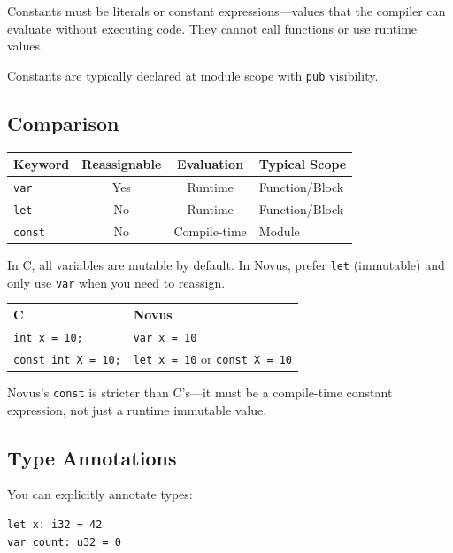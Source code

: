 Constants must be literals or constant expressions---values that the compiler can evaluate without executing code. They cannot call functions or use runtime values.

Constants are typically declared at module scope with \texttt{pub} visibility.

\subsection{Comparison}

\begin{center}
\begin{tabular}{lccl}
\textbf{Keyword} & \textbf{Reassignable} & \textbf{Evaluation} & \textbf{Typical Scope} \\
\hline
\texttt{var} & Yes & Runtime & Function/Block \\
\texttt{let} & No & Runtime & Function/Block \\
\texttt{const} & No & Compile-time & Module \\
\end{tabular}
\end{center}

\begin{comingfromc}
In C, all variables are mutable by default. In Novus, prefer \texttt{let} (immutable) and only use \texttt{var} when you need to reassign.

\begin{tabular}{ll}
\textbf{C} & \textbf{Novus} \\
\texttt{int x = 10;} & \texttt{var x = 10} \\
\texttt{const int X = 10;} & \texttt{let x = 10} or \texttt{const X = 10} \\
\end{tabular}

Novus's \texttt{const} is stricter than C's---it must be a compile-time constant expression, not just a runtime immutable value.
\end{comingfromc}

\subsection{Type Annotations}

You can explicitly annotate types:

\begin{lstlisting}
let x: i32 = 42
var count: u32 = 0
\end{lstlisting}

